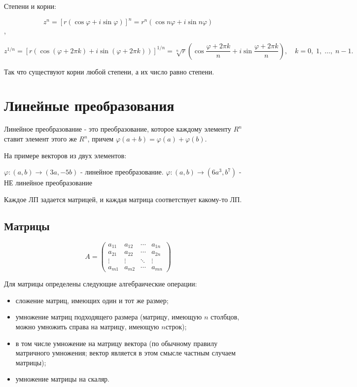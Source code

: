\documentclass{article}
\begin{document}
Степени и корни:

$$ z^{n}=\left[r\left(\cos \varphi +i\sin \varphi \right)\right]^{n}=r^{n}\left(\cos n\varphi +i\sin n\varphi \right)$$,

$$z^{1/n}=\left[r\left(\cos \left(\varphi +2\pi k\right)+i\sin \left(\varphi +2\pi k\right)\right)\right]^{1/n}={\sqrt[{n}]{r}}\left(\cos {\frac {\varphi +2\pi k}{n}}+i\sin {\frac {\varphi +2\pi k}{n}}\right),\quad k=0,\;1,\;\ldots ,\;n-1.$$

Так что существуют корни любой степени, а их число равно степени.


\section*{Линейные преобразования}

Линейное преобразование - это преобразование, которое каждому элементу $R^n$ ставит элемент этого же $R^n$, причем $\varphi(a+b) = \varphi(a) + \varphi(b)$. 

На примере векторов из двух элементов:

$\varphi: (a,b) \to (3a, -5b)$ - линейное преобразование.
$\varphi: (a,b) \to (6a^3, b^7)$ - НЕ линейное преобразование

Каждое ЛП задается матрицей, и каждая матрица соответствует какому-то ЛП.

\subsection*{Матрицы}

$$A=\begin{pmatrix}
a_{11}  &a_{12}  &\cdots  &a_{1n} \\
a_{21}  &a_{22}  &\cdots  &a_{2n} \\
\vdots  &\vdots  &\ddots  &\vdots \\
a_{m1}&a_{m2}&\cdots  &a_{mn}
\end{pmatrix}$$

Для матрицы определены следующие алгебраические операции:
\begin{itemize}
    \item сложение матриц, имеющих один и тот же размер;
    \item умножение матриц подходящего размера (матрицу, имеющую $n$ столбцов, можно умножить справа на матрицу, имеющую $n$строк);
    \item в том числе умножение на матрицу вектора (по обычному правилу матричного умножения; вектор является в этом смысле частным случаем матрицы);
    \item умножение матрицы на скаляр.
\end{itemize}
\end{document}
